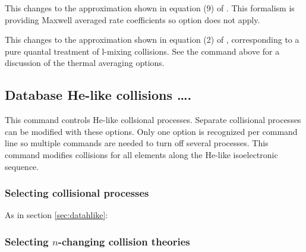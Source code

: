   This
changes to the approximation shown in equation (9) of \citet{VOS2012}. This formalism is providing Maxwell averaged rate coefficients so  option does not apply. 

  This
changes to the approximation shown in equation (2) of \citet{VOS2012}, 
corresponding to a pure quantal treatment of l-mixing collisions.
See the  
command above for a discussion of the thermal averaging options.

\subsection{Database He-like collisions \dots.}

This command controls He-like collsional processes. Separate collisional processes can be modified
with these options.
Only one option is recognized per command line
so multiple commands are needed to turn off several processes.
This command modifies collisions for all elements along the He-like
isoelectronic sequence.

\subsubsection{Selecting collisional processes}

As in section \ref{sec:datahlike}:





\subsubsection{Selecting $n$-changing collision theories}

